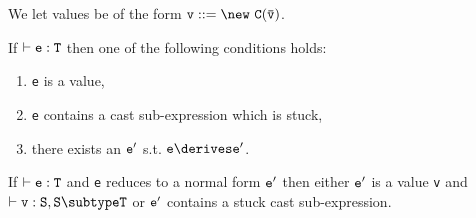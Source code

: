 We let values be of the form $\tt v ::= \new\ C(\bar{\tt v})$. 
\begin{theorem}[Progress]
If $\vdash {\tt e:T}$ then one of the following conditions holds:
\begin{enumerate}
\item {\tt e} is a value,
\item {\tt e} contains a cast sub-expression which is stuck,
\item there exists an $\tt e'$ s.t. $\tt e\derives e'$.
\end{enumerate}
\end{theorem}

\begin{theorem}
If $\vdash {\tt e:T}$ and {\tt e} reduces to a normal form ${\tt e'}$ then
either $\tt e'$ is a value {\tt v} and $\vdash {\tt v:S},{\tt S\subtype T}$ or
${\tt e'}$ contains  a stuck cast sub-expression.
\end{theorem}






